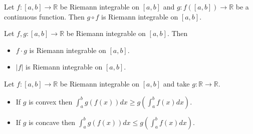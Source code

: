 \documentclass{article}
\begin{document}
\begin{theorem}
  Let $f: [a, b] \to \mathbb{R}$ be Riemann integrable on $[a, b]$ and $g: f([a, b]) \to \mathbb{R}$ be a continuous function. Then $g \circ f$ is Riemann integrable on $[a, b]$.
\end{theorem}

\begin{corollary}
  Let $f, g: [a, b] \to \mathbb{R}$ be Riemann integrable on $[a, b]$. Then
  \begin{itemize}[label=$\bullet$]
    \item $f \cdot g$ is Riemann integrable on $[a, b]$.

    \item $|f|$ is Riemann integrable on $[a, b]$.
  \end{itemize}
\end{corollary}

\begin{theorem}
  Let $f: [a, b] \to \mathbb{R}$ be Riemann integrable on $[a, b]$ and take $g: \mathbb{R} \to \mathbb{R}$.
  \begin{itemize}[label=$\bullet$]
    \item If $g$ is convex then $\displaystyle\int_{a}^{b} g(f(x)) dx \ge g\left(\int_{a}^{b} f(x) dx\right)$.

    \item If $g$ is concave then $\displaystyle\int_{a}^{b} g(f(x)) dx \le g\left(\int_{a}^{b} f(x) dx\right)$.
  \end{itemize}
\end{theorem}
\end{document}
